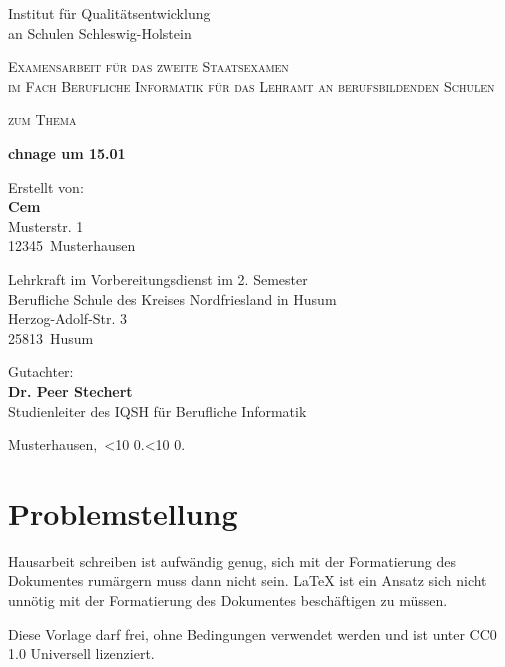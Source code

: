 \documentclass[a4paper, 12pt]{article}
\title{\haThema}
\author{\haAutor}
\date{\today}
\newcommand{\leadingzero}[1]{\ifnum #1<10 0\the#1\else\the#1\fi}
\newcommand{\datumVonHeute}{\leadingzero{\day}.\leadingzero{\month}.\the\year}
\newcommand{\haThema}{chnage um 15.01}
\newcommand{\haAutor}{Cem}
\newcommand{\haAutorAdresse}{Musterstr. 1}
\newcommand{\haAutorPLZ}{12345}
\newcommand{\haAutorOrt}{Musterhausen}
\newcommand{\haDeckblattTextEins}{Examensarbeit für das zweite Staatsexamen\\ im Fach Berufliche Informatik für das Lehramt an berufsbildenden Schulen}
\newcommand{\haDeckblattTextZwei}{Lehrkraft im Vorbereitungsdienst im 2. Semester}
\newcommand{\haSchule}{Berufliche Schule des Kreises Nordfriesland in Husum}
\newcommand{\haSchuleAdresse}{Herzog-Adolf-Str. 3}
\newcommand{\haSchulePLZ}{25813}
\newcommand{\haSchuleOrt}{Husum}
\newcommand{\haGutachter}{Dr. Peer Stechert}
\newcommand{\haGutachterText}{Studienleiter des IQSH für Berufliche Informatik}
\begin{document}
\begin{titlepage}
Institut für Qualitätsentwicklung\\
an Schulen Schleswig-Holstein
\begin{center}
\vspace{1.5cm}
{\scshape\large \haDeckblattTextEins \par}
\vspace{1cm}
{\scshape\large zum Thema\par}
\vspace{1.5cm}
{\LARGE\bfseries \haThema \par}
\vfill
{Erstellt von:\\ {\bfseries \haAutor}\\ \haAutorAdresse\\ \haAutorPLZ~\haAutorOrt \par}
\vspace{1cm}
{\haDeckblattTextZwei \\ \haSchule \\ \haSchuleAdresse \\ \haSchulePLZ~\haSchuleOrt \par}
\vspace{1cm}
Gutachter:\\ {\bfseries \haGutachter}\\ \haGutachterText
\vfill
\end{center}
{\haAutorOrt,~\datumVonHeute\par}
\end{titlepage}
\thispagestyle{empty}
\newpage

\tableofcontents
\thispagestyle{empty}
\newpage

\setcounter{page}{1}



\section{Problemstellung}

Hausarbeit schreiben ist aufwändig genug, sich mit der Formatierung des Dokumentes rumärgern muss dann nicht sein. \LaTeX{} ist ein Ansatz sich nicht unnötig mit der Formatierung des Dokumentes beschäftigen zu müssen.

Diese Vorlage darf frei, ohne Bedingungen verwendet werden und ist unter CC0 1.0 Universell lizenziert.
\end{document}
